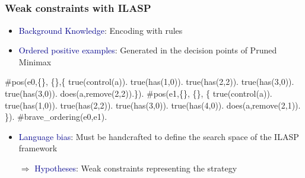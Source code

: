 \documentclass{beamer}
\newcommand\re[1]{\textcolor{darkblue}{#1}}
\begin{document}

\subsection{}
\begin{frame}[fragile]
  \frametitle{Weak constraints with ILASP}
  \footnotesize
  \begin{itemize}[<+->]
    \item \re{Background Knowledge}: Encoding with rules\\
    \item \re{Ordered positive examples}: Generated in the decision points of Pruned Minimax
  \end{itemize}
  \pause
  \begin{example}
    \begin{semiverbatim}
#pos(e0,\{\}, \{\},\{ 
  true(control(a)). true(has(1,0)). true(has(2,2)). 
  true(has(3,0)). true(has(3,0)). does(a,remove(2,2)).\}).
#pos(e1,\{\}, \{\}, \{
  true(control(a)). true(has(1,0)). true(has(2,2)).
  true(has(3,0)). true(has(4,0)). does(a,remove(2,1)). \}).      
#brave_ordering(e0,e1).    
  \end{semiverbatim}
  \end{example}
  \pause
  \begin{itemize}[<+->]
    \item \re{Language bias}: Must be handcrafted to define the search space of the ILASP framework\\
    \item[$\Longrightarrow$] \re{Hypotheses}: Weak constraints representing the strategy
  \end{itemize}
\end{frame}

  
\end{document}
